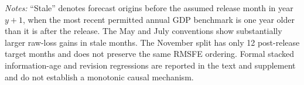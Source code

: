 \begin{table}[htbp]
\centering\scriptsize
\caption{One-month GRE performance before and after the assumed annual-data release month}
\label{tab:staleness}
\vspace{0.35em}
\begin{minipage}{0.97\textwidth}\normalsize\textit{Notes:} ``Stale'' denotes forecast origins before the assumed release month in year $y+1$, when the most recent permitted annual GDP benchmark is one year older than it is after the release. The May and July conventions show substantially larger raw-loss gains in stale months. The November split has only 12 post-release target months and does not preserve the same RMSFE ordering. Formal stacked information-age and revision regressions are reported in the text and supplement and do not establish a monotonic causal mechanism.\end{minipage}
\end{table}
